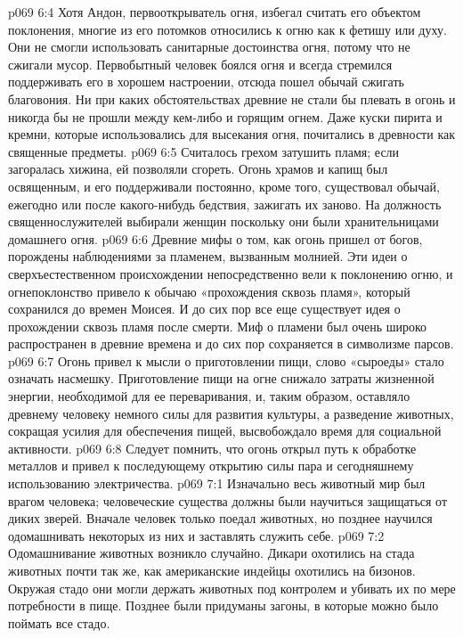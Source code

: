 \vs p069 6:4 \pc Хотя Андон, первооткрыватель огня, избегал считать его объектом поклонения, многие из его потомков относились к огню как к фетишу или духу. Они не смогли использовать санитарные достоинства огня, потому что не сжигали мусор. Первобытный человек боялся огня и всегда стремился поддерживать его в хорошем настроении, отсюда пошел обычай сжигать благовония. Ни при каких обстоятельствах древние не стали бы плевать в огонь и никогда бы не прошли между кем\hyp{}либо и горящим огнем. Даже куски пирита и кремни, которые использовались для высекания огня, почитались в древности как священные предметы.
\vs p069 6:5 Считалось грехом затушить пламя; если загоралась хижина, ей позволяли сгореть. Огонь храмов и капищ был освященным, и его поддерживали постоянно, кроме того, существовал обычай, ежегодно или после какого\hyp{}нибудь бедствия, зажигать их заново. На должность священнослужителей выбирали женщин поскольку они были хранительницами домашнего огня.
\vs p069 6:6 Древние мифы о том, как огонь пришел от богов, порождены наблюдениями за пламенем, вызванным молнией. Эти идеи о сверхъестественном происхождении непосредственно вели к поклонению огню, и огнепоклонство привело к обычаю «прохождения сквозь пламя», который сохранился до времен Моисея. И до сих пор все еще существует идея о прохождении сквозь пламя после смерти. Миф о пламени был очень широко распространен в древние времена и до сих пор сохраняется в символизме парсов.
\vs p069 6:7 \pc Огонь привел к мысли о приготовлении пищи, слово «сыроеды» стало означать насмешку. Приготовление пищи на огне снижало затраты жизненной энергии, необходимой для ее переваривания, и, таким образом, оставляло древнему человеку немного силы для развития культуры, а разведение животных, сокращая усилия для обеспечения пищей, высвобождало время для социальной активности.
\vs p069 6:8 Следует помнить, что огонь открыл путь к обработке металлов и привел к последующему открытию силы пара и сегодняшнему использованию электричества.
\vs p069 7:1 Изначально весь животный мир был врагом человека; человеческие существа должны были научиться защищаться от диких зверей. Вначале человек только поедал животных, но позднее научился одомашнивать некоторых из них и заставлять служить себе.
\vs p069 7:2 Одомашнивание животных возникло случайно. Дикари охотились на стада животных почти так же, как американские индейцы охотились на бизонов. Окружая стадо они могли держать животных под контролем и убивать их по мере потребности в пище. Позднее были придуманы загоны, в которые можно было поймать все стадо.
